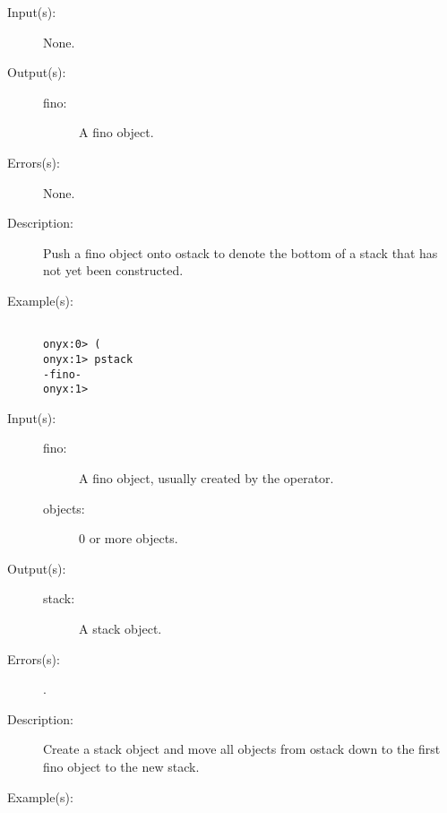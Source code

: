 \begin{description}
\label{systemdict:sym_lp}
\item[{\onyxop{--}{(}{fino}}: ]
	\begin{description}\item[]
	\item[Input(s): ] None.
	\item[Output(s): ]
		\begin{description}\item[]
		\item[fino: ]
			A fino object.
		\end{description}
	\item[Errors(s): ] None.
	\item[Description: ]
		Push a fino object onto ostack to denote the bottom of a stack
		that has not yet been constructed.
	\item[Example(s): ]\begin{verbatim}

onyx:0> (
onyx:1> pstack
-fino-
onyx:1>
		\end{verbatim}
	\end{description}
\label{systemdict:sym_rp}
\item[{\onyxop{fino objects}{)}{stack}}: ]
	\begin{description}\item[]
	\item[Input(s): ]
		\begin{description}\item[]
		\item[fino: ]
			A fino object, usually created by the \onyxop{}{)}{}
			operator.
		\item[objects: ]
			0 or more objects.
		\end{description}
	\item[Output(s): ]
		\begin{description}\item[]
		\item[stack: ]
			A stack object.
		\end{description}
	\item[Errors(s): ]
		\begin{description}\item[]
		\item[.]
		\end{description}
	\item[Description: ]
		Create a stack object and move all objects from ostack down to
		the first fino object to the new stack.
	\item[Example(s): ]\begin{verbatim}


\end{verbatim}
\end{description}
\end{description}
